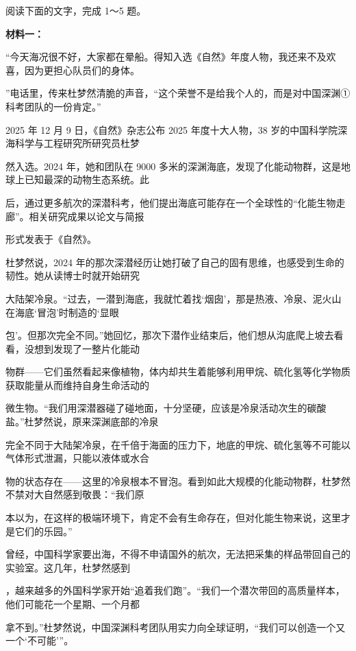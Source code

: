 \documentclass[UTF8,a4paper,fontset=fandol]{ctexart}
\begin{document}
阅读下面的文字，完成 1～5 题。\par
\textbf{材料一：}\par
\hspace*{1.8em}“今天海况很不好，大家都在晕船。得知入选《自然》年度人物，我还来不及欢喜，因为更担心队员们的身体。\par
”电话里，传来杜梦然清脆的声音，“这个荣誉不是给我个人的，而是对中国深渊①科考团队的一份肯定。”\par
\hspace*{1.8em}2025 年 12 月 9 日，《自然》杂志公布 2025 年度十大人物，38 岁的中国科学院深海科学与工程研究所研究员杜梦\par
然入选。2024 年，她和团队在 9000 多米的深渊海底，发现了化能动物群，这是地球上已知最深的动物生态系统。此\par
后，通过更多航次的深潜科考，他们提出海底可能存在一个全球性的“化能生物走廊”。相关研究成果以论文与简报\par
形式发表于《自然》。\par
\hspace*{1.8em}杜梦然说，2024 年的那次深潜经历让她打破了自己的固有思维，也感受到生命的韧性。她从读博士时就开始研究\par
大陆架冷泉。“过去，一潜到海底，我就忙着找‘烟囱’，那是热液、冷泉、泥火山在海底‘冒泡’时制造的‘显眼\par
包’。但那次完全不同。”她回忆，那次下潜作业结束后，他们想从沟底爬上坡去看看，没想到发现了一整片化能动\par
物群——它们虽然看起来像植物，体内却共生着能够利用甲烷、硫化氢等化学物质获取能量从而维持自身生命活动的\par
微生物。“我们用深潜器碰了碰地面，十分坚硬，应该是冷泉活动次生的碳酸盐。”杜梦然说，原来深渊底部的冷泉\par
完全不同于大陆架冷泉，在千倍于海面的压力下，地底的甲烷、硫化氢等不可能以气体形式泄漏，只能以液体或水合\par
物的状态存在——这里的冷泉根本不冒泡。看到如此大规模的化能动物群，杜梦然不禁对大自然感到敬畏：“我们原\par
本以为，在这样的极端环境下，肯定不会有生命存在，但对化能生物来说，这里才是它们的乐园。”\par
\hspace*{1.8em}曾经，中国科学家要出海，不得不申请国外的航次，无法把采集的样品带回自己的实验室。这几年，杜梦然感到\par
，越来越多的外国科学家开始“追着我们跑”。“我们一个潜次带回的高质量样本，他们可能花一个星期、一个月都\par
拿不到。”杜梦然说，中国深渊科考团队用实力向全球证明，“我们可以创造一个又一个‘不可能’”。\par
\end{document}
